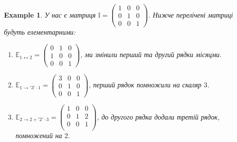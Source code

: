 \documentclass[a4paper, 10pt]{article}
\theoremstyle{theoremdd}
\newtheorem{example}[theorem]{Example}
\begin{document}
\begin{example}
	У нас є матриця $\mathbb{I} = \begin{pmatrix}
	1 & 0 & 0 \\
	0 & 1 & 0 \\
	0 & 0 & 1
	\end{pmatrix}$. Нижче перелічені матриці будуть елементарними:
	\begin{enumerate}[nosep,wide=0pt]
	\item $\mathbb{E}_{1 \leftrightarrow 2} = \begin{pmatrix}
	0 & 1 & 0 \\
	1 & 0 & 0 \\
	0 & 0 & 1 
	\end{pmatrix}$, ми змінили перший та другий рядки місяцми.
	\item $\mathbb{E}_{1 \rightarrow '3' \cdot 1} = \begin{pmatrix}
	3 & 0 & 0 \\
	0 & 1 & 0 \\
	0 & 0 & 1
	\end{pmatrix}$, перший рядок помножили на скаляр $3$.
	\item $\mathbb{E}_{2 \rightarrow 2 + '2'\cdot 3} = \begin{pmatrix}
	1 & 0 & 0 \\
	0 & 1 & 2 \\
	0 & 0 & 1 \\
	\end{pmatrix}$, до другого рядка додали третій рядок, помножений на $2$.
	\end{enumerate}
\end{example}
\end{document}
